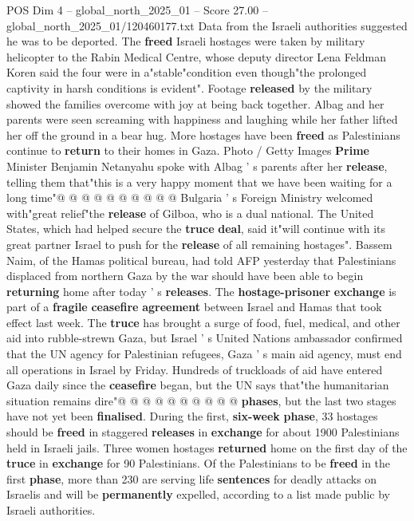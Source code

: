 \begin{textsample}{POS Dim 4 – global\_north\_2025\_01 – Score 27.00 – global\_north\_2025\_01/120460177.txt}
Data from the Israeli authorities suggested he was to be deported.
The \textbf{freed} Israeli hostages were taken by military helicopter to the Rabin Medical Centre, whose deputy director Lena Feldman Koren said the four were in a"stable"condition even though"the prolonged captivity in harsh conditions is evident".
Footage \textbf{released} by the military showed the families overcome with joy at being back together.
Albag and her parents were seen screaming with happiness and laughing while her father lifted her off the ground in a bear hug.
More hostages have been \textbf{freed} as Palestinians continue to \textbf{return} to their homes in Gaza.
Photo / Getty Images \textbf{Prime} Minister Benjamin Netanyahu spoke with Albag ' s parents after her \textbf{release}, telling them that"this is a very happy moment that we have been waiting for a long time"@ @ @ @ @ @ @ @ @ @ Bulgaria ' s Foreign Ministry welcomed with"great relief"the \textbf{release} of Gilboa, who is a dual national.
The United States, which had helped secure the \textbf{truce} \textbf{deal}, said it"will continue with its great partner Israel to push for the \textbf{release} of all remaining hostages".
Bassem Naim, of the Hamas political bureau, had told AFP yesterday that Palestinians displaced from northern Gaza by the war should have been able to begin \textbf{returning} home after today ' s \textbf{releases}.
The \textbf{hostage-prisoner} \textbf{exchange} is part of a \textbf{fragile} \textbf{ceasefire} \textbf{agreement} between Israel and Hamas that took effect last week.
The \textbf{truce} has brought a surge of food, fuel, medical, and other aid into rubble-strewn Gaza, but Israel ' s United Nations ambassador confirmed that the UN agency for Palestinian refugees, Gaza ' s main aid agency, must end all operations in Israel by Friday.
Hundreds of truckloads of aid have entered Gaza daily since the \textbf{ceasefire} began, but the UN says that"the humanitarian situation remains dire"@ @ @ @ @ @ @ @ @ @ \textbf{phases}, but the last two stages have not yet been \textbf{finalised}.
During the first, \textbf{six-week} \textbf{phase}, 33 hostages should be \textbf{freed} in staggered \textbf{releases} in \textbf{exchange} for about 1900 Palestinians held in Israeli jails.
Three women hostages \textbf{returned} home on the first day of the \textbf{truce} in \textbf{exchange} for 90 Palestinians.
Of the Palestinians to be \textbf{freed} in the first \textbf{phase}, more than 230 are serving life \textbf{sentences} for deadly attacks on Israelis and will be \textbf{permanently} expelled, according to a list made public by Israeli authorities.

\end{textsample}
